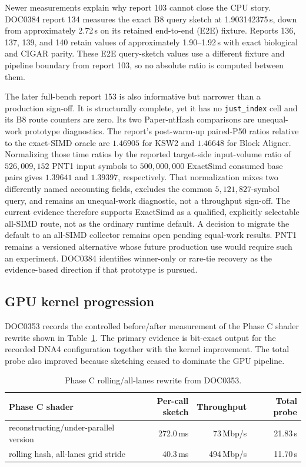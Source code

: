 Newer measurements explain why report 103 cannot close the CPU story.
DOC0384 report 134 measures the exact B8 query sketch at
1.903142375\,s, down from approximately 2.72\,s on its retained end-to-end
(E2E) fixture.
Reports 136, 137, 139, and 140 retain values of approximately 1.90--1.92\,s with exact
biological and CIGAR parity. These E2E query-sketch values use a different
fixture and pipeline boundary from report 103, so no absolute ratio is
computed between them.

The later full-bench report 153 is also informative but narrower than a
production sign-off. It is structurally complete, yet it has no
\texttt{just\_index} cell and its B8 route counters are zero. Its two
Paper-ntHash comparisons are unequal-work prototype diagnostics. The report's
post-warm-up paired-P50 ratios relative to the exact-SIMD oracle are
\(1.46905\) for KSW2 and
\(1.46648\) for Block Aligner.
Normalizing those time ratios by the reported target-side input-volume ratio of
\(526{,}009{,}152\) PNT1 input symbols to \(500{,}000{,}000\) ExactSimd
consumed base pairs gives \(1.39641\) and \(1.39397\), respectively.  That normalization mixes
two differently named accounting fields, excludes the common
\(5{,}121{,}827\)-symbol query, and remains an unequal-work
diagnostic, not a throughput sign-off. The current evidence therefore
supports ExactSimd as a qualified, explicitly selectable all-SIMD route, not
as the ordinary runtime default. A decision to migrate the default to an
all-SIMD collector remains open pending equal-work results. PNT1 remains a
versioned alternative whose future production use would require such an
experiment. DOC0384 identifies winner-only or rare-tie recovery as the
evidence-based direction if that prototype is pursued.

\subsection{GPU kernel progression}

DOC0353 records the controlled before/after measurement of the Phase C shader
rewrite shown in Table~\ref{tab:gpu-minimizer-rewrite}. The primary evidence is
bit-exact output for the recorded DNA4 configuration together with the kernel
improvement. The total probe also improved because sketching ceased to dominate
the GPU pipeline.

\begin{table}[htbp]
\centering
\caption{Phase C rolling/all-lanes rewrite from DOC0353.}
\label{tab:gpu-minimizer-rewrite}
\small
\begin{tabular}{lrrr}
\toprule
Phase C shader & Per-call sketch & Throughput & Total probe \\
\midrule
reconstructing/under-parallel version & 272.0\,ms & 73\,Mbp/s & 21.83\,s \\
rolling hash, all-lanes grid stride & 40.3\,ms & 494\,Mbp/s & 11.70\,s \\
\bottomrule
\end{tabular}
\end{table}

